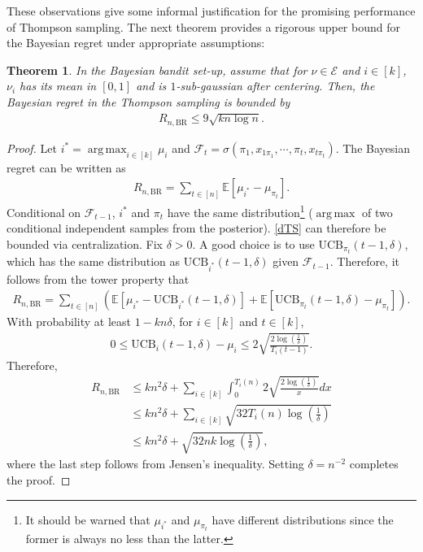 \documentclass[10pt,a4article]{article}
\numberwithin{equation}{section}
\theoremstyle{plain}
\newtheorem{Th}{Theorem}[section]
\theoremstyle{definition}
\def\E{{\mathbb E}}
\def\BR{{\text{BR}}}
\DeclareMathOperator*{\argmax}{arg\,max}
\begin{document}
These observations give some informal justification for the promising performance of Thompson sampling. The next theorem provides a rigorous upper bound for the Bayesian regret under appropriate assumptions:

\begin{Th}
In the Bayesian bandit set-up, assume that for $\nu\in\mathcal E$ and $i\in [k]$, $\nu_i$ has its mean in $[0,1]$ and is $1$-sub-gaussian after centering. Then, the Bayesian regret in the Thompson sampling is bounded by
\begin{align*}
R_{n,\BR}\leq 9\sqrt{kn\log n}. 
\end{align*}
\end{Th}

\begin{proof}
Let $i^*=\argmax_{i\in [k]}\mu_i$ and $\mathcal F_t = \sigma(\pi_1, x_{1\pi_1},\cdots, \pi_t, x_{t\pi_t})$. The Bayesian regret can be written as
\begin{align}
R_{n, \BR} = \sum_{t\in [n]}\E[\mu_{i^*}-\mu_{\pi_t}]. \label{dTS}
\end{align}
Conditional on $\mathcal F_{t-1}$, $i^*$ and $\pi_t$ have the same distribution\footnote{It should be warned that $\mu_{i^*}$ and $\mu_{\pi_t}$ have different distributions since the former is always no less than the latter.} ($\argmax$ of two conditional independent samples from the posterior). \eqref{dTS} can therefore be bounded via centralization. Fix $\delta>0$. A good choice is to use $\text{UCB}_{\pi_t}(t-1,\delta)$, which has the same distribution as $\text{UCB}_{i^*}(t-1,\delta)$ given $\mathcal F_{t-1}$.  Therefore, it follows from the tower property that
\begin{align*}
R_{n, \BR} =  \sum_{t\in [n]}\left(\E[\mu_{i^*}-\text{UCB}_{i^*}(t-1,\delta)]+\E[\text{UCB}_{\pi_t}(t-1,\delta)-\mu_{\pi_t}]\right).
\end{align*}
With probability at least $1-kn\delta$, for $i\in [k]$ and $t\in [k]$,
\begin{align*}
0\leq \text{UCB}_{i}(t-1,\delta)-\mu_{i}\leq 2\sqrt{\frac{2\log\left(\frac{1}{\delta}\right)}{T_i(t-1)}}.
\end{align*}
Therefore,
\begin{align*}
R_{n,\BR}&\leq kn^2\delta + \sum_{i\in [k]}\int_{0}^{T_{i}(n)}2\sqrt{\frac{2\log\left(\frac{1}{\delta}\right)}{x}}dx\\
&\leq kn^2\delta + \sum_{i\in [k]}\sqrt{32T_i(n)\log\left(\frac{1}{\delta}\right)}\\
&\leq kn^2\delta+\sqrt{32nk\log\left(\frac{1}{\delta}\right)},
\end{align*}
where the last step follows from Jensen's inequality. Setting $\delta=n^{-2}$ completes the proof. 
\end{proof}
\end{document}
